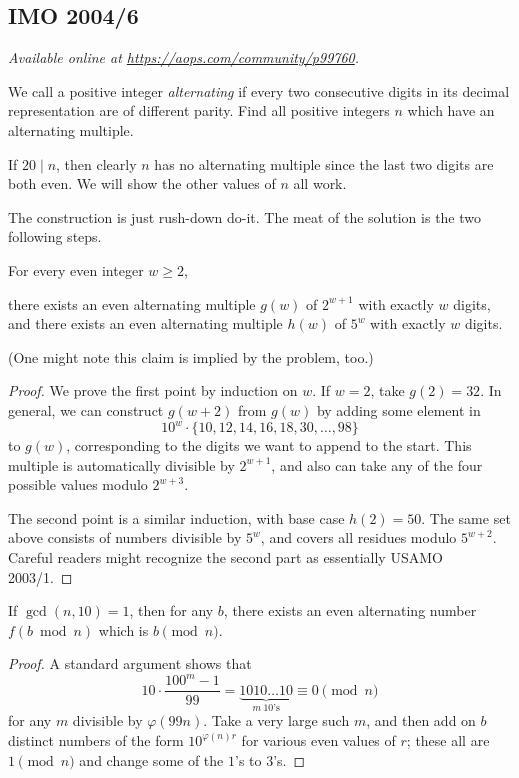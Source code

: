 \documentclass[11pt]{scrartcl}
\begin{document}
\subsection{IMO 2004/6}
\textsl{Available online at \url{https://aops.com/community/p99760}.}
\begin{mdframed}[style=mdpurplebox,frametitle={Problem statement}]
We call a positive integer \emph{alternating}
if every two consecutive digits
in its decimal representation are of different parity.
Find all positive integers $n$ which have an alternating multiple.
\end{mdframed}
If $20 \mid n$, then clearly $n$ has no alternating
multiple since the last two digits are both even.
We will show the other values of $n$ all work.

The construction is just rush-down do-it.
The meat of the solution is the two following steps.
\begin{claim*}
  For every even integer $w \ge 2$,
  \begin{itemize}
    \ii there exists an even alternating multiple $g(w)$ of $2^{w+1}$
    with exactly $w$ digits, and
    \ii there exists an even alternating multiple $h(w)$ of $5^{w}$
    with exactly $w$ digits.
  \end{itemize}
\end{claim*}
(One might note this claim is implied by the problem, too.)
\begin{proof}
  We prove the first point by induction on $w$.
  If $w = 2$, take $g(2) = 32$.
  In general, we can construct $g(w+2)$ from $g(w)$
  by adding some element in
  \[ 10^w \cdot \{10, 12, 14, 16, 18, 30, \dots, 98\} \]
  to $g(w)$, corresponding to the digits
  we want to append to the start.
  This multiple is automatically divisible by $2^{w+1}$,
  and also can take any of the four possible values modulo $2^{w+3}$.

  The second point is a similar induction,
  with base case $h(2) = 50$.
  The same set above consists of numbers divisible by $5^w$,
  and covers all residues modulo $5^{w+2}$.
  Careful readers might recognize the second part
  as essentially USAMO 2003/1.
\end{proof}

\begin{claim*}
  If $\gcd(n,10) = 1$, then for any $b$,
  there exists an even alternating number $f(b \bmod n)$ which is
  $b \pmod n$.
\end{claim*}
\begin{proof}
  A standard argument shows that
  \[ 10 \cdot \frac{100^m-1}{99}
    = \underbrace{1010\dots10}_{m\ 10\text{'s}}
    \equiv 0 \pmod n \]
  for any $m$ divisible by $\varphi(99n)$.
  Take a very large such $m$,
  and then add on $b$ distinct numbers of the form $10^{\varphi(n)r}$
  for various even values of $r$; these all are $1 \pmod n$
  and change some of the $1$'s to $3$'s.
\end{proof}
\end{document}
